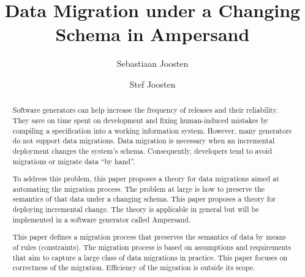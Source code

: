 \documentclass[runningheads]{llncs}
\begin{document}
%

\title{Data Migration under a Changing Schema in Ampersand}
%
%
\author{Sebastiaan Joosten\\ \and
Stef Joosten}
%
%
%
\maketitle              %
%
\begin{abstract}
Software generators can help increase the frequency of releases and their reliability.
They save on time spent on development and fixing human-induced mistakes by compiling a specification into a working information system.
However, many generators do not support data migrations.
Data migration is necessary when an incremental deployment changes the system's schema.
Consequently, developers tend to avoid migrations or migrate data ``by hand''.

To address this problem, this paper proposes a theory for data migrations aimed at automating the migration process.
The problem at large is how to preserve the semantics of that data under a changing schema.
This paper proposes a theory for deploying incremental change.
The theory is applicable in general but will be implemented in a software generator called Ampersand.

This paper defines a migration process that preserves the semantics of data by means of rules (constraints).
The migration process is based on assumptions and requirements that aim to capture a large class of data migrations in practice.
This paper focuses on correctness of the migration. Efficiency of the migration is outside its scope.

\end{abstract}
%
%
%
\end{document}
